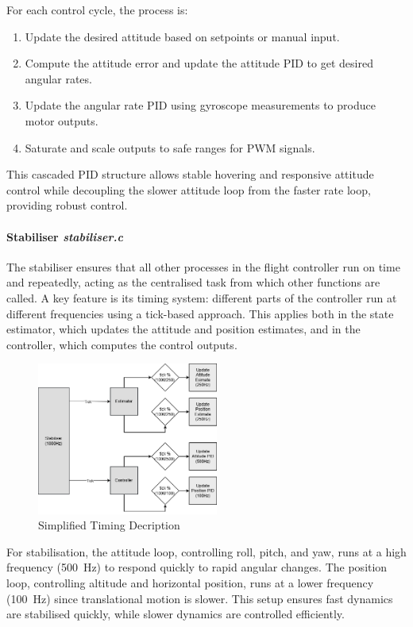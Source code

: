 For each control cycle, the process is:
\begin{enumerate}
    \item Update the desired attitude based on setpoints or manual input.
    \item Compute the attitude error and update the attitude PID to get desired angular rates.
    \item Update the angular rate PID using gyroscope measurements to produce motor outputs.
    \item Saturate and scale outputs to safe ranges for PWM signals.
\end{enumerate}

This cascaded PID structure allows stable hovering and responsive attitude control while decoupling the slower attitude loop from the faster rate loop, providing robust control.

\paragraph{\textbf{Stabiliser} \textit{stabiliser.c}} \leavevmode

The stabiliser ensures that all other processes in the flight controller run on time and repeatedly, acting as the centralised task from which other functions are called. A key feature is its timing system: different parts of the controller run at different frequencies using a tick-based approach. This applies both in the state estimator, which updates the attitude and position estimates, and in the controller, which computes the control outputs.  

\begin{figure}[H]
    \centering
    \captionsetup{justification=centering, margin=1cm}
    \includegraphics[width=0.53\textwidth]{img/timing.PNG}
    \caption{Simplified Timing Decription}
\end{figure}

For stabilisation, the attitude loop, controlling roll, pitch, and yaw, runs at a high frequency (500~Hz) to respond quickly to rapid angular changes. The position loop, controlling altitude and horizontal position, runs at a lower frequency (100~Hz) since translational motion is slower. This setup ensures fast dynamics are stabilised quickly, while slower dynamics are controlled efficiently.

